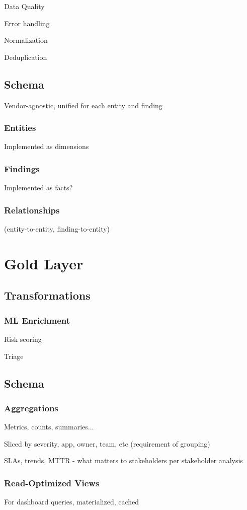 Data Quality

Error handling

Normalization

Deduplication

\subsection{Schema}

Vendor-agnostic, unified for each entity and finding

\subsubsection{Entities}

Implemented as dimensions

\subsubsection{Findings}

Implemented as facts?

\subsubsection{Relationships}

(entity-to-entity, finding-to-entity)

\section{Gold Layer}

\subsection{Transformations}

\subsubsection{ML Enrichment}

Risk scoring

Triage

\subsection{Schema}

\subsubsection{Aggregations}

Metrics, counts, summaries...

Sliced by severity, app, owner, team, etc (requirement of grouping)

SLAs, trends, MTTR - what matters to stakeholders per stakeholder analysis

\subsubsection{Read-Optimized Views}

For dashboard queries, materialized, cached